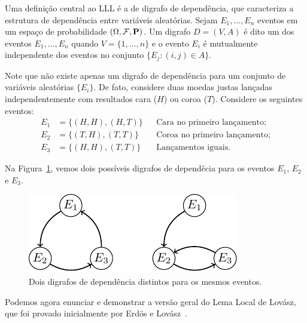 Uma definição central ao LLL é a de digrafo de dependência, que caracteriza a estrutura de dependência entre variáveis aleatórias. Sejam $E_1, \dots, E_n$ eventos em um espaço de probabilidade $(\Omega, \mathcal{F}, \operatorname{\mathbf{P}})$. Um digrafo $D = (V,A)$ é dito um  dos eventos $E_1, \dots, E_n$ quando $V = \{1, \dots, n\}$ e o evento $E_i$ é mutualmente independente dos eventos no conjunto $\{ E_j : (i,j) \in A\}$.

Note que não existe apenas um digrafo de dependência para um conjunto de variáveis aleatórias $\{E_i\}$. De fato, considere duas moedas justas lançadas independentemente com resultados cara ($H$) ou coroa ($T$). Considere os seguintes eventos:
\begin{align*}
  E_1 &= \{ (H,H) , (H,T) \} && \text{Cara no primeiro lançamento;}\\
  E_2 &= \{ (T,H) , (T,T) \} && \text{Coroa no primeiro lançamento;}\\
  E_3 &= \{ (H,H) , (T,T) \} && \text{Lançamentos iguais.}
\end{align*}

Na Figura~\ref{prob:fig:ddigraph}, vemos dois possíveis digrafos de dependêcia para os eventos $E_1$, $E_2$ e $E_3$.

\begin{figure}[ht!]
\centering
\includegraphics{figures/4_prob_1_ddigraph}
\caption{Dois digrafos de dependência distintos para os mesmos eventos.}
\label{prob:fig:ddigraph}
\end{figure}

Podemos agora enunciar e demonstrar a versão geral do Lema Local de Lovász, que foi provado inicialmente por Erdös e Lovász~\cite{erdos1975problems}.

